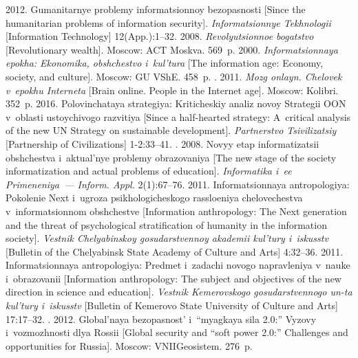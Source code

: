 \begin{multicols}{2}
{{\begin{thebibliography}{99}
       2012. Gumanitarnye problemy infor\-ma\-tsi\-onnoy bezopasnosti [Since 
the humanitarian problems of information security]. \textit{Informatsionnye Tekhnologii}  
[Information Technology] 12(App.):1--32.
 2008. \textit{Revolyutsionnoe bogatstvo} [Revolutionary wealth]. Moscow: 
ACT Moskva. 569~p.
       2000. \textit{Informatsionnaya epokha: Ekonomika, obshchestvo 
i~kul'tura} [The information age: Economy, society, and culture]. Moscow: GU VShE. 458~p.
      . 2011. \textit{Mozg onlayn. Chelovek v~epokhu 
Interneta} [Brain online. People in the Internet age]. Moscow: Kolibri. 352~p.
       2016. Polovinchataya strategiya: Kriticheskiy analiz novoy Strategii 
OON v~oblasti ustoychivogo razvitiya [Since a half-hearted strategy: A~critical analysis of the 
new UN Strategy on sustainable development]. \textit{Partnerstvo Tsivilizatsiy}  
[Partnership of  Civilizations] 1-2:33--41.
      . 2008. Novyy etap informatizatsii obshchestva 
i~aktual'nye problemy obrazovaniya 
[The new stage of the society informatization and actual 
problems of education]. \textit{Informatika i~ee Primeneniya~--- Inform. Appl.} 
2(1):67--76.
       2011. Informatsionnaya antropologiya: Pokolenie Next i~ugroza 
psikhologicheskogo rassloeniya chelovechestva v~informatsionnom obshchestve [Information 
anthropology: The Next generation and the threat of psychological stratification of humanity in 
the information society]. \textit{Vestnik Chelyabinskoy gosudarstvennoy akademii kul'tury 
i~iskusstv}  [Bulletin of the Chelyabinsk State Academy of Culture and Arts] 4:32--36.
       2011. Informatsionnaya antropologiya: Predmet i~zadachi novogo 
napravleniya v~nauke i~obrazovanii [Information anthropology: The subject and objectives of the 
new direction in science and education]. \textit{Vestnik Kemerovskogo gosudarstvennogo un-ta 
kul'tury i~iskusstv}  [Bulletin of Kemerovo State University of Culture and Arts] 17:17--32.
      . 2012. Global'naya bezopasnost' 
i~``myagkaya sila 2.0:'' Vyzovy i~vozmozhnosti dlya Rossii [Global security and ``soft power 
2.0:'' Challenges and opportunities for Russia]. Moscow: \mbox{VNIIGeosistem}. 276~p.

\end{thebibliography}}}
\end{multicols}
